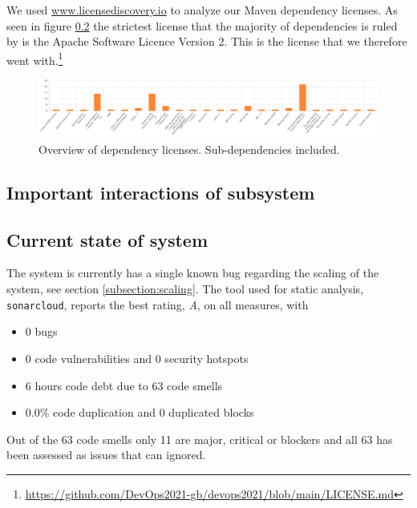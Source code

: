 We used \url{www.licensediscovery.io} to analyze our Maven dependency licenses. As seen in figure \ref{} the strictest license that the majority of dependencies is ruled by is the Apache Software Licence Version 2. This is the license that we therefore went with.\footnote{\url{https://github.com/DevOps2021-gb/devops2021/blob/main/LICENSE.md}} 
\begin{figure}[!htb]
    \centering
    \includegraphics[scale=0.2]{report/images/LicenceDependencies.png}
    \caption{Overview of dependency licenses. Sub-dependencies included.}
    \label{fig:my_label}
\end{figure}


\subsection{Important interactions of subsystem}

\subsection{Current state of system}
The system is currently has a single known bug regarding the scaling of the system, see section \ref{subsection:scaling}. The tool used for static analysis, \texttt{sonarcloud}, reports the best rating, \textit{A}, on all measures, with 

\begin{itemize}
    \item 0 bugs
    \item 0 code vulnerabilities and 0 security hotspots
    \item 6 hours code debt due to 63 code smells
    \item 0.0\% code duplication and 0 duplicated blocks
\end{itemize}

Out of the 63 code smells only 11 are major, critical or blockers and all 63 has been assessed as issues that can ignored.

